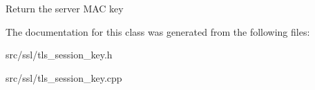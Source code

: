 Return the server M\-A\-C key 

The documentation for this class was generated from the following files\-:\begin{DoxyCompactItemize}
\item 
src/ssl/tls\-\_\-session\-\_\-key.\-h\item 
src/ssl/tls\-\_\-session\-\_\-key.\-cpp\end{DoxyCompactItemize}
